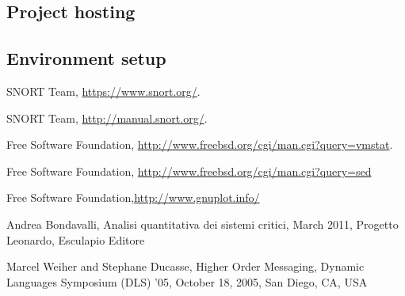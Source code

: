 \documentclass[10pt,a4paper]{article}
\begin{document}
    \subsection{Project hosting}

    \subsection{Environment setup}

    

    \begin{thebibliography}{9}

      SNORT Team,
      \url{https://www.snort.org/}.

      SNORT Team,
      \url{http://manual.snort.org/}.

      Free Software Foundation,
      \url{http://www.freebsd.org/cgi/man.cgi?query=vmstat}.

      Free Software Foundation,
      \url{http://www.freebsd.org/cgi/man.cgi?query=sed}

     Free Software
      Foundation,\url{http://www.gnuplot.info/}

     Andrea Bondavalli, Analisi quantitativa dei
      sistemi critici, March 2011, Progetto Leonardo, Esculapio
      Editore

     Marcel Weiher and Stephane Ducasse,
      Higher Order Messaging, Dynamic Languages Symposium (DLS) '05,
      October 18, 2005, San Diego, CA, USA


    \end{thebibliography}
\end{document}
